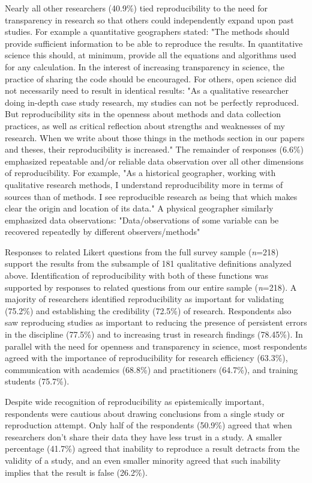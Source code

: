 \documentclass[]{interact}
\theoremstyle{plain}%
\theoremstyle{definition}
\theoremstyle{remark}
\begin{document}
Nearly all other researchers (40.9\%) tied reproducibility to the need for transparency in research so that others could independently expand upon past studies.
For example a quantitative geographers stated: "The methods should provide sufficient information to be able to reproduce the results. In quantitative science this should, at minimum, provide all the equations and algorithms used for any calculation. In the interest of increasing transparency in science, the practice of sharing the code should be encouraged.
For others, open science did not necessarily need to result in identical results: "As a qualitative researcher doing in-depth case study research, my studies can not be perfectly reproduced. But reproducibility sits in the openness about methods and data collection practices, as well as critical reflection about strengths and weaknesses of my research. When we write about those things in the methods section in our papers and theses, their reproducibility is increased." 
The remainder of responses (6.6\%) emphasized repeatable and/or reliable data observation over all other dimensions of reproducibility.
For example, "As a historical geographer, working with qualitative research methods, I understand reproducibility more in terms of sources than of methods. I see reproducible research as being that which makes clear the origin and location of its data."
A physical geographer similarly emphasized data observations: "Data/observations of some variable can be recovered repeatedly by different observers/methods"  

Responses to related Likert questions from the full survey sample (\textit{n}=218) support the results from the subsample of 181 qualitative definitions analyzed above.
Identification of reproducibility with both of these functions was supported by responses to related questions from our entire sample (\textit{n}=218). 
A majority of researchers identified reproducibility as important for validating (75.2\%) and establishing the credibility (72.5\%) of research.  
Respondents also saw reproducing studies as important to reducing the presence of persistent errors in the discipline (77.5\%) and to increasing trust in research findings (78.45\%).
In parallel with the need for openness and transparency in science, most respondents agreed with the importance of reproducibility for research efficiency (63.3\%), communication with academics (68.8\%) and practitioners (64.7\%), and training students (75.7\%).

Despite wide recognition of reproducibility as epistemically important, respondents were cautious about drawing conclusions from a single study or reproduction attempt. 
Only half of the respondents (50.9\%) agreed that when researchers don't share their data they have less trust in a study.
A smaller percentage (41.7\%) agreed that inability to reproduce a result detracts from the validity of a study, and an even smaller minority agreed that such inability implies that the result is false (26.2\%).
\end{document}
